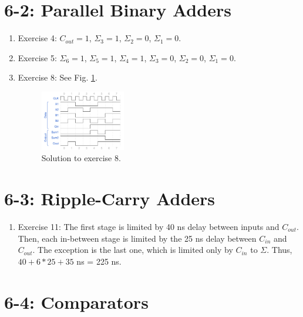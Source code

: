 \documentclass[10pt]{article}
\begin{document}
\maketitle

\section{6-2: Parallel Binary Adders}

\begin{enumerate}
\item Exercise 4: $C_{out} = 1$, $\Sigma_3 = 1$, $\Sigma_2 = 0$, $\Sigma_1 = 0$.
\item Exercise 5: $\Sigma_6 = 1$, $\Sigma_5 = 1$, $\Sigma_4 = 1$, $\Sigma_3 = 0$, $\Sigma_2 = 0$, $\Sigma_1 = 0$.
\item Exercise 8: See Fig. \ref{fig:wave1}.
\begin{figure}[ht]
\centering
\includegraphics[width=0.35\textwidth]{code/hmk5_6-2-8.pdf}
\caption{\label{fig:wave1} Solution to exercise 8.}
\end{figure}
\end{enumerate}

\section{6-3: Ripple-Carry Adders}

\begin{enumerate}
\item Exercise 11: The first stage is limited by 40 ns delay between inputs and $C_{out}$.  Then, each in-between stage is limited by the 25 ns delay between $C_{in}$ and $C_{out}$. The exception is the last one, which is limited only by $C_{in}$ to $\Sigma$.  Thus, $40 + 6*25 + 35$ ns = 225 ns.
\end{enumerate}

\section{6-4: Comparators}
\end{document}
